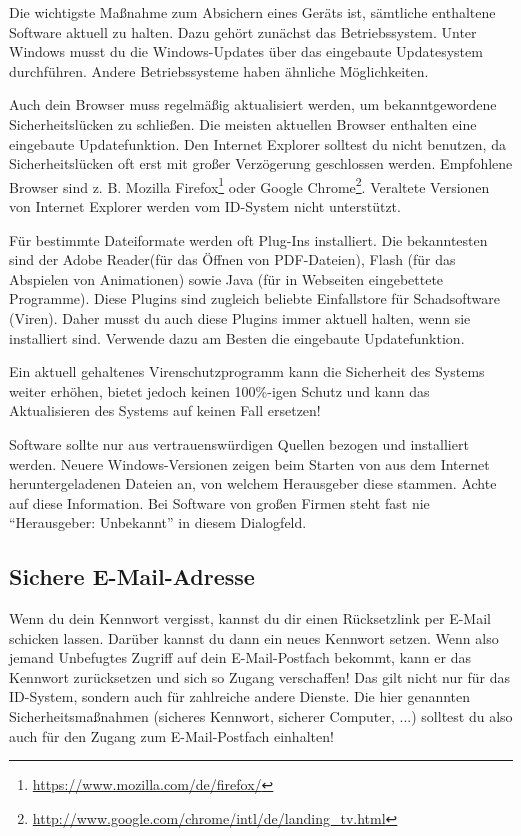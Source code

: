\documentclass[parskip=half]{scrartcl}
\begin{document}
Die wichtigste Maßnahme zum Absichern eines Geräts ist, sämtliche enthaltene Software aktuell zu halten.
Dazu gehört zunächst das Betriebssystem.
Unter Windows musst du die Windows-Updates über das eingebaute Updatesystem durchführen. Andere Betriebssysteme haben ähnliche Möglichkeiten.

Auch dein Browser muss regelmäßig aktualisiert werden, um bekanntgewordene Sicherheitslücken zu schließen.
Die meisten aktuellen Browser enthalten eine eingebaute Updatefunktion.
Den Internet Explorer solltest du nicht benutzen, da Sicherheitslücken oft erst mit großer Verzögerung geschlossen werden.
Empfohlene Browser sind z. B. Mozilla Firefox\footnote{\url{https://www.mozilla.com/de/firefox/}}
oder Google Chrome\footnote{\url{http://www.google.com/chrome/intl/de/landing_tv.html}}.
Veraltete Versionen von Internet Explorer werden vom ID-System nicht unterstützt.

Für bestimmte Dateiformate werden oft Plug-Ins installiert.
Die bekanntesten sind der Adobe Reader(für das Öffnen von PDF-Dateien),
Flash (für das Abspielen von Animationen) sowie
Java (für in Webseiten eingebettete Programme).
Diese Plugins sind zugleich beliebte Einfallstore für Schadsoftware (Viren).
Daher musst du auch diese Plugins immer aktuell halten, wenn sie installiert sind.
Verwende dazu am Besten die eingebaute Updatefunktion.

Ein aktuell gehaltenes Virenschutzprogramm kann die Sicherheit des Systems weiter erhöhen,
bietet jedoch keinen 100\%-igen Schutz und kann das Aktualisieren des Systems auf keinen Fall ersetzen!

Software sollte nur aus vertrauenswürdigen Quellen bezogen und installiert werden.
Neuere Windows-Versionen zeigen beim Starten von aus dem Internet heruntergeladenen Dateien an, von welchem Herausgeber diese stammen.
Achte auf diese Information. Bei Software von großen Firmen steht fast nie "`Herausgeber: Unbekannt"' in diesem Dialogfeld.

\subsection{Sichere E-Mail-Adresse}
Wenn du dein Kennwort vergisst, kannst du dir einen Rücksetzlink per E-Mail schicken lassen.
Darüber kannst du dann ein neues Kennwort setzen.
Wenn also jemand Unbefugtes Zugriff auf dein E-Mail-Postfach bekommt,
kann er das Kennwort zurücksetzen und sich so Zugang verschaffen!
Das gilt nicht nur für das ID-System, sondern auch für zahlreiche andere Dienste.
Die hier genannten Sicherheitsmaßnahmen (sicheres Kennwort, sicherer Computer, ...) solltest du also auch für den Zugang zum E-Mail-Postfach einhalten!
\end{document}
